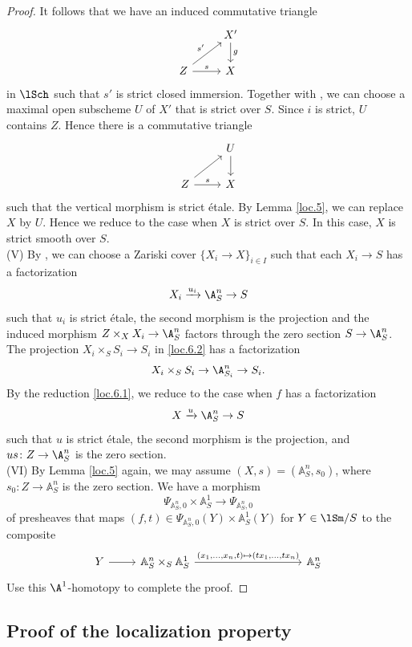 \documentclass[10pt]{amsart}
\begin{document}
\begin{proof}
It follows that we have an induced commutative triangle
\[
\begin{tikzcd}
&X'\arrow[d,"g"]\\
Z\arrow[r,"s"]\arrow[ru,"s'"]&X
\end{tikzcd}
\]
in $\lSch$ such that $s'$ is strict closed immersion.
Together with \cite[Lemma A.11.2]{logDM}, we can choose a maximal open subscheme $U$ of $X'$ that is strict over $S$.
Since $i$ is strict, $U$ contains $Z$.
Hence there is a commutative triangle
\[
\begin{tikzcd}
&U\arrow[d]\\
Z\arrow[r,"s"]\arrow[ru]&X
\end{tikzcd}
\]
such that the vertical morphism is strict \'etale.
By Lemma \ref{loc.5}, we can replace $X$ by $U$.
Hence we reduce to the case when $X$ is strict over $S$.
In this case, $X$ is strict smooth over $S$.
\\[5pt]
(V) By \cite[Corollarie IV.17.12.2(d)]{EGA}, we can choose a Zariski cover $\{X_i\to X\}_{i\in I}$ such that each $X_i\to S$ has a factorization
\[
X_i\xrightarrow{u_i} \A_S^n \to S
\]
such that $u_i$ is strict \'etale, the second morphism is the projection and the induced morphism $Z\times_X X_i\to \A_S^n$ factors through the zero section $S\to \A_S^n$.
The projection $X_i\times_S S_i \to S_i$ in \eqref{loc.6.2} has a factorization
\[
X_i\times_S S_i \to \A_{S_i}^n \to S_i.
\]
By the reduction \eqref{loc.6.1}, we reduce to the case when $f$ has a factorization
\[
X\xrightarrow{u}\A_S^n\to S
\]
such that $u$ is strict \'etale, the second morphism is the projection, and $us\colon Z\to \A_S^n$ is the zero section.
\\[5pt]
(VI)
By Lemma \ref{loc.5} again, we may assume $(X,s)=(\mathbb{A}_S^n,s_0)$, where $s_0\colon Z\rightarrow \mathbb{A}_S^n$ is the zero section.
We have a morphism
\begin{equation}
\label{loc.6.3}
\Psi_{\mathbb{A}_S^n,0}\times\mathbb{A}_S^1
\to
\Psi_{\mathbb{A}_S^n,0}
\end{equation}
of presheaves that maps $(f,t)\in \Psi_{\mathbb{A}_S^n,0}(Y)\times\mathbb{A}_S^1(Y)$ for $Y\in \lSm/S$ to the composite
\[
\begin{tikzcd}
Y\arrow{r}&\mathbb{A}_S^n
\times_S\mathbb{A}_S^1\arrow{rrrr}{(x_1,\ldots,x_n,t)\mapsto
(tx_1,\ldots,tx_n)}&&&&\mathbb{A}_S^n
\end{tikzcd}
\]
Use this $\A^1$-homotopy to complete the proof.
\end{proof}

\subsection{Proof of the localization property}
\label{proof}
\end{document}
